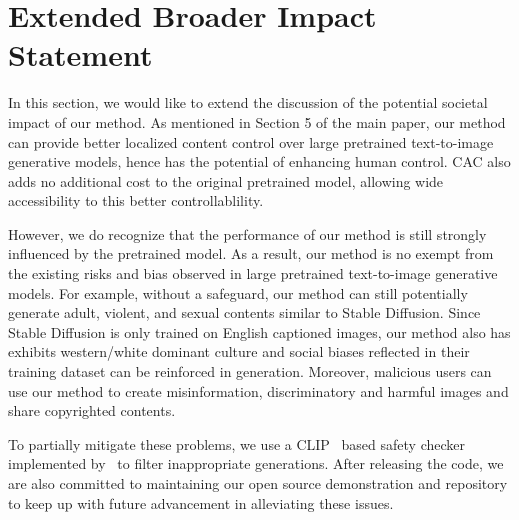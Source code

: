 \section{Extended Broader Impact Statement}

In this section, we would like to extend the discussion of the potential societal impact of our method. As mentioned in Section 5 of the main paper, our method can provide better localized content control over large pretrained text-to-image generative models, hence has the potential of enhancing human control. CAC also adds no additional cost to the original pretrained model, allowing wide accessibility to this better controllablility.

However, we do recognize that the performance of our method is still strongly influenced by the pretrained model. As a result, our method is no exempt from the existing risks and bias observed in large pretrained text-to-image generative models. For example, without a safeguard, our method can still potentially generate adult, violent, and sexual contents similar to Stable Diffusion. Since Stable Diffusion is only trained on English captioned images, our method also has exhibits western/white dominant culture and social biases reflected in their training dataset can be reinforced in generation. Moreover, malicious users can use our method to create misinformation, discriminatory and harmful images and share copyrighted contents.

To partially mitigate these problems, we use a CLIP~\citep{clip} based safety checker implemented by~\citet{safeguard} to filter inappropriate generations. After releasing the code, we are also committed to maintaining our open source demonstration and repository to keep up with future advancement in alleviating these issues.